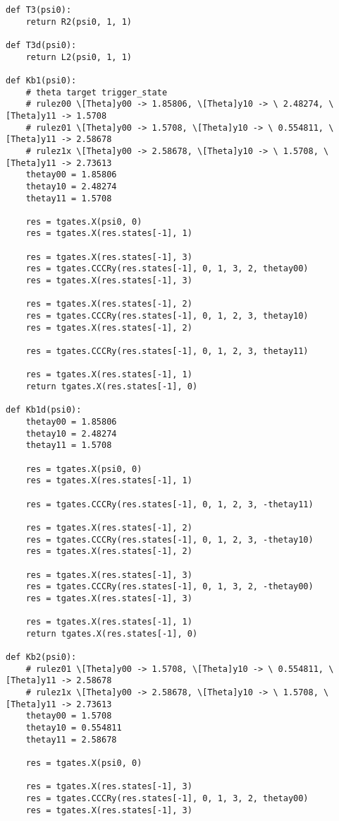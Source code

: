 \begin{verbatim}
def T3(psi0):
    return R2(psi0, 1, 1)

def T3d(psi0):
    return L2(psi0, 1, 1)

def Kb1(psi0):
    # theta target trigger_state
    # rulez00 \[Theta]y00 -> 1.85806, \[Theta]y10 -> \ 2.48274, \[Theta]y11 -> 1.5708
    # rulez01 \[Theta]y00 -> 1.5708, \[Theta]y10 -> \ 0.554811, \[Theta]y11 -> 2.58678
    # rulez1x \[Theta]y00 -> 2.58678, \[Theta]y10 -> \ 1.5708, \[Theta]y11 -> 2.73613
    thetay00 = 1.85806
    thetay10 = 2.48274
    thetay11 = 1.5708

    res = tgates.X(psi0, 0)
    res = tgates.X(res.states[-1], 1)

    res = tgates.X(res.states[-1], 3)
    res = tgates.CCCRy(res.states[-1], 0, 1, 3, 2, thetay00)
    res = tgates.X(res.states[-1], 3)

    res = tgates.X(res.states[-1], 2)
    res = tgates.CCCRy(res.states[-1], 0, 1, 2, 3, thetay10)
    res = tgates.X(res.states[-1], 2)

    res = tgates.CCCRy(res.states[-1], 0, 1, 2, 3, thetay11)

    res = tgates.X(res.states[-1], 1)
    return tgates.X(res.states[-1], 0)

def Kb1d(psi0):
    thetay00 = 1.85806
    thetay10 = 2.48274
    thetay11 = 1.5708

    res = tgates.X(psi0, 0)
    res = tgates.X(res.states[-1], 1)

    res = tgates.CCCRy(res.states[-1], 0, 1, 2, 3, -thetay11)

    res = tgates.X(res.states[-1], 2)
    res = tgates.CCCRy(res.states[-1], 0, 1, 2, 3, -thetay10)
    res = tgates.X(res.states[-1], 2)

    res = tgates.X(res.states[-1], 3)
    res = tgates.CCCRy(res.states[-1], 0, 1, 3, 2, -thetay00)
    res = tgates.X(res.states[-1], 3)

    res = tgates.X(res.states[-1], 1)
    return tgates.X(res.states[-1], 0)

def Kb2(psi0):
    # rulez01 \[Theta]y00 -> 1.5708, \[Theta]y10 -> \ 0.554811, \[Theta]y11 -> 2.58678
    # rulez1x \[Theta]y00 -> 2.58678, \[Theta]y10 -> \ 1.5708, \[Theta]y11 -> 2.73613
    thetay00 = 1.5708
    thetay10 = 0.554811
    thetay11 = 2.58678

    res = tgates.X(psi0, 0)

    res = tgates.X(res.states[-1], 3)
    res = tgates.CCCRy(res.states[-1], 0, 1, 3, 2, thetay00)
    res = tgates.X(res.states[-1], 3)


\end{verbatim}

